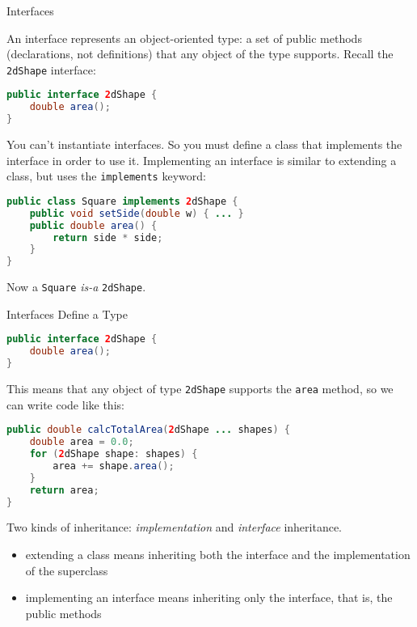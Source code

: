 \documentclass{beamer}
\begin{document}
\begin{frame}[fragile]{Interfaces}


An interface represents an object-oriented type: a set of public methods (declarations, not definitions) that any object of the type supports.  Recall the {\tt 2dShape} interface:

\begin{lstlisting}[language=Java]
public interface 2dShape {
    double area();
}
\end{lstlisting}

You can't instantiate interfaces.  So you must define a class that implements the interface in order to use it.  Implementing an interface is similar to extending a class, but uses the {\tt implements} keyword:

\begin{lstlisting}[language=Java]
public class Square implements 2dShape {
    public void setSide(double w) { ... }
    public double area() {
        return side * side;
    }
}
\end{lstlisting}

Now a {\tt Square} {\it is-a} {\tt 2dShape}.


\end{frame}


\begin{frame}[fragile]{Interfaces Define a Type}
\vspace{-.05in}
\begin{lstlisting}[language=Java]
public interface 2dShape {
    double area();
}
\end{lstlisting}
\vspace{-.05in}
This means that any object of type {\tt 2dShape} supports the {\tt area} method, so we can write code like this:
\vspace{-.05in}
\begin{lstlisting}[language=Java]
public double calcTotalArea(2dShape ... shapes) {
    double area = 0.0;
    for (2dShape shape: shapes) {
        area += shape.area();
    }
    return area;
}
\end{lstlisting}
\vspace{-.05in}

Two kinds of inheritance: {\it implementation} and {\it interface} inheritance.

\begin{itemize}
\item extending a class means inheriting both the interface and the implementation of the superclass
\item implementing an interface means inheriting only the interface, that is, the public methods
\end{itemize}

\end{frame}
\end{document}
